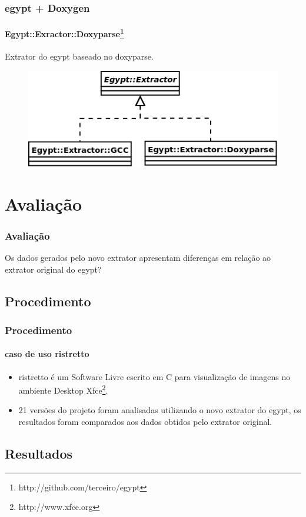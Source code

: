 \documentclass{beamer}
\begin{document}
\begin{frame}
\frametitle{egypt + Doxygen}
\framesubtitle{Egypt::Exractor::Doxyparse\footnote{http://github.com/terceiro/egypt}}
 Extrator do egypt baseado no doxyparse.
 \begin{figure}[h]
 \center
 \includegraphics[scale=0.3]{imagens/egypt-diagram-extractor}
 \label{egypt-diagram-extractor}
 \end{figure}
\end{frame}

\section{Avaliação}

\begin{frame}
\frametitle{Avaliação}
 Os dados gerados pelo novo extrator apresentam diferenças em relação ao
 extrator original do egypt?
\end{frame}

\subsection{Procedimento}

\begin{frame}
\frametitle{Procedimento}
\framesubtitle{caso de uso ristretto}
\begin{itemize}
 \item ristretto é um Software Livre escrito em C para visualização de imagens no
 ambiente Desktop Xfce\footnote{http://www.xfce.org}.

 \item 21 versões do projeto foram analisadas utilizando o novo extrator do egypt,
 os resultados foram comparados aos dados obtidos pelo extrator original.
\end{itemize}
\end{frame}

\subsection{Resultados}
\end{document}
